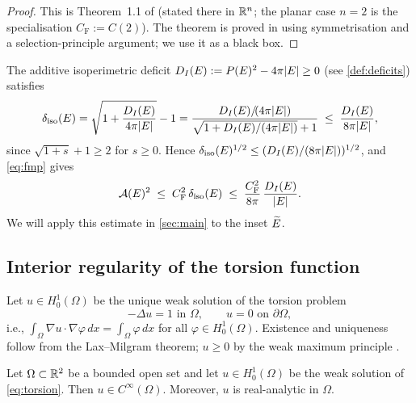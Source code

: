 \begin{proof}
This is Theorem~1.1 of \cite{FMP2008} (stated there in $\mathbb{R}^n$; the planar case
$n=2$ is the specialisation $C_{\mathrm{F}}:=C(2)$).  The theorem is proved in
\cite{FMP2008} using symmetrisation and a selection-principle argument; we use
it as a black box.
\end{proof}

\begin{remark}\label{rem:deficit-forms}
The additive isoperimetric deficit
$D_I(E) := P(E)^2 - 4\pi|E| \ge 0$ (see \cref{def:deficits}) satisfies
\[
  \delta_{\mathrm{iso}}(E) = \sqrt{1 + \frac{D_I(E)}{4\pi|E|}}-1
  = \frac{D_I(E)/\!(4\pi|E|)}{\sqrt{1+D_I(E)/(4\pi|E|)}+1}
  \;\le\; \frac{D_I(E)}{8\pi|E|},
\]
since $\sqrt{1+s}+1\ge 2$ for $s\ge 0$.
Hence $\delta_{\mathrm{iso}}(E)^{1/2} \le (D_I(E)/(8\pi|E|))^{1/2}$, and \eqref{eq:fmp} gives
\[
  \mathcal{A}(E)^2 \;\le\; C_{\mathrm{F}}^2\,\delta_{\mathrm{iso}}(E)
  \;\le\; \frac{C_{\mathrm{F}}^2}{8\pi}\,\frac{D_I(E)}{|E|}.
\]
We will apply this estimate in \cref{sec:main} to the inset $\widetilde{E}$.
\end{remark}

\subsection{Interior regularity of the torsion function}

Let $u\in H^1_0(\Omega)$ be the unique weak solution of the torsion problem
\begin{equation}\label{eq:torsion}
  -\Delta u = 1 \text{ in }\Omega, \qquad u = 0 \text{ on }\partial\Omega,
\end{equation}
i.e., $\int_\Omega\nabla u\cdot\nabla\varphi\,dx=\int_\Omega\varphi\,dx$ for
all $\varphi\in H^1_0(\Omega)$.  Existence and uniqueness follow from the
Lax--Milgram theorem; $u\ge 0$ by the weak maximum principle
\cite[Theorem~8.1]{GilbargTrudinger2001}.

\begin{theorem}\label{thm:torsion-reg}
Let $\Omega\subset\mathbb{R}^2$ be a bounded open set and let $u\in H^1_0(\Omega)$ be the
weak solution of \eqref{eq:torsion}.  Then $u\in C^\infty(\Omega)$.
Moreover, $u$ is real-analytic in $\Omega$.
\end{theorem}

